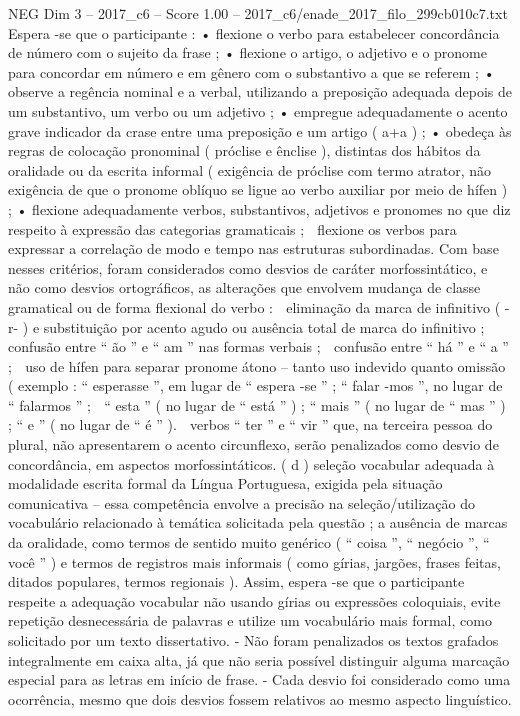 \begin{textsample}{NEG Dim 3 – 2017\_c6 – Score 1.00 – 2017\_c6/enade\_2017\_filo\_299cb010c7.txt}
Espera -se que o participante : • flexione o verbo para estabelecer concordância de número com o sujeito da frase ; • flexione o artigo, o adjetivo e o pronome para concordar em número e em gênero com o substantivo a que se referem ; • observe a regência nominal e a verbal, utilizando a preposição adequada depois de um substantivo, um verbo ou um adjetivo ; • empregue adequadamente o acento grave indicador da crase entre uma preposição e um artigo ( a+a ) ; • obedeça às regras de colocação pronominal ( próclise e ênclise ), distintas dos hábitos da oralidade ou da escrita informal ( exigência de próclise com termo atrator, não exigência de que o pronome oblíquo se ligue ao verbo auxiliar por meio de hífen ) ; • flexione adequadamente verbos, substantivos, adjetivos e pronomes no que diz respeito à expressão das categorias gramaticais ;  flexione os verbos para expressar a correlação de modo e tempo nas estruturas subordinadas.
Com base nesses critérios, foram considerados como desvios de caráter morfossintático, e não como desvios ortográficos, as alterações que envolvem mudança de classe gramatical ou de forma flexional do verbo :  eliminação da marca de infinitivo ( -r- ) e substituição por acento agudo ou ausência total de marca do infinitivo ;  confusão entre “ ão ” e “ am ” nas formas verbais ;  confusão entre “ há ” e “ a ” ;  uso de hífen para separar pronome átono – tanto uso indevido quanto omissão ( exemplo : “ esperasse ”, em lugar de “ espera -se ” ; “ falar -mos ”, no lugar de “ falarmos ” ;  “ esta ” ( no lugar de “ está ” ) ; “ mais ” ( no lugar de “ mas ” ) ; “ e ” ( no lugar de “ é ” ).  verbos “ ter ” e “ vir ” que, na terceira pessoa do plural, não apresentarem o acento circunflexo, serão penalizados como desvio de concordância, em aspectos morfossintáticos. ( d ) seleção vocabular adequada à modalidade escrita formal da Língua Portuguesa, exigida pela situação comunicativa – essa competência envolve a precisão na seleção/utilização do vocabulário relacionado à temática solicitada pela questão ; a ausência de marcas da oralidade, como termos de sentido muito genérico ( “ coisa ”, “ negócio ”, “ você ” ) e termos de registros mais informais ( como gírias, jargões, frases feitas, ditados populares, termos regionais ).
Assim, espera -se que o participante respeite a adequação vocabular não usando gírias ou expressões coloquiais, evite repetição desnecessária de palavras e utilize um vocabulário mais formal, como solicitado por um texto dissertativo. - Não foram penalizados os textos grafados integralmente em caixa alta, já que não seria possível distinguir alguma marcação especial para as letras em início de frase. - Cada desvio foi considerado como uma ocorrência, mesmo que dois desvios fossem relativos ao mesmo aspecto linguístico.

\end{textsample}
